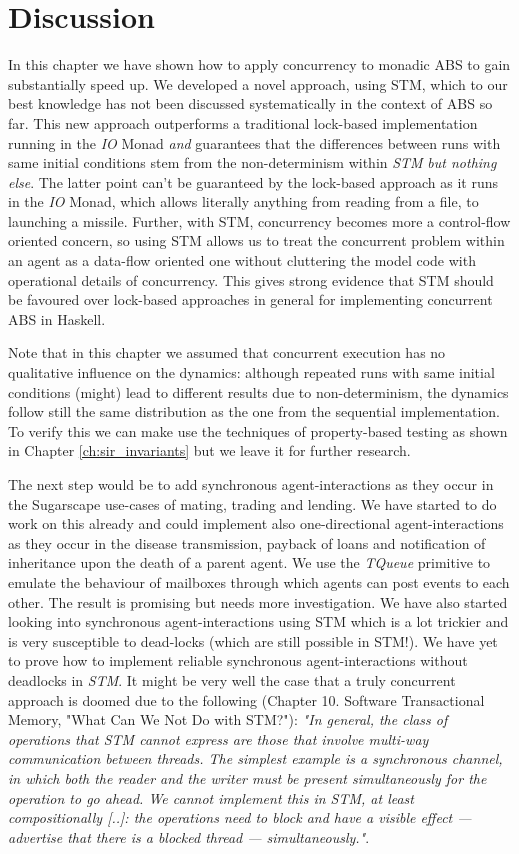 \section{Discussion}
In this chapter we have shown how to apply concurrency to monadic ABS to gain substantially speed up. We developed a novel approach, using STM, which to our best knowledge has not been discussed systematically in the context of ABS so far. This new approach outperforms a traditional lock-based implementation running in the \textit{IO} Monad \textit{and} guarantees that the differences between runs with same initial conditions stem from the non-determinism within \textit{STM} \textit{but nothing else}. The latter point can't be guaranteed by the lock-based approach as it runs in the \textit{IO} Monad, which allows literally anything from reading from a file, to launching a missile. Further, with STM, concurrency becomes more a control-flow oriented concern, so using STM allows us to treat the concurrent problem within an agent as a data-flow oriented one without cluttering the model code with operational details of concurrency. This gives strong evidence that STM should be favoured over lock-based approaches in general for implementing concurrent ABS in Haskell.

Note that in this chapter we assumed that concurrent execution has no qualitative influence on the dynamics: although repeated runs with same initial conditions (might) lead to different results due to non-determinism, the dynamics follow still the same distribution as the one from the sequential implementation. To verify this we can make use the techniques of property-based testing as shown in Chapter \ref{ch:sir_invariants} but we leave it for further research.

The next step would be to add synchronous agent-interactions as they occur in the Sugarscape use-cases of mating, trading and lending. We have started to do work on this already and could implement also one-directional agent-interactions as they occur in the disease transmission, payback of loans and notification of inheritance upon the death of a parent agent. We use the \textit{TQueue} primitive to emulate the behaviour of mailboxes through which agents can post events to each other. The result is promising but needs more investigation. We have also started looking into synchronous agent-interactions using STM which is a lot trickier and is very susceptible to dead-locks (which are still possible in STM!). We have yet to prove how to implement reliable synchronous agent-interactions without deadlocks in \textit{STM}. It might be very well the case that a truly concurrent approach is doomed due to the following \cite{marlow_parallel_2013} (Chapter 10. Software Transactional Memory, "What Can We Not Do with STM?"): \textit{"In general, the class of operations that STM cannot express are those that involve multi-way communication between threads. The simplest example is a synchronous channel, in which both the reader and the writer must be present simultaneously for the operation to go ahead. We cannot implement this in STM, at least compositionally [..]: the operations need to block and have a visible effect — advertise that there is a blocked thread — simultaneously."}. 


